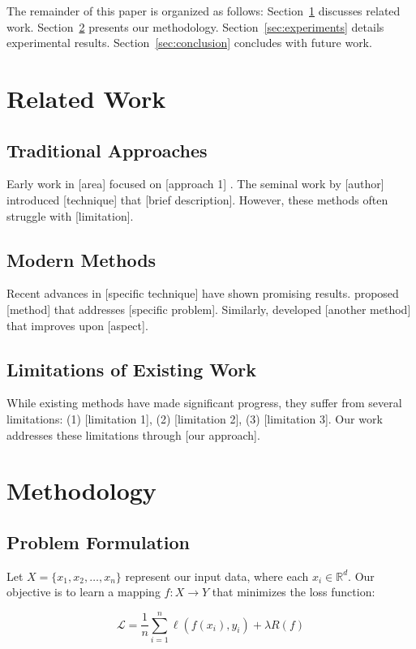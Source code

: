 \documentclass[10pt,twocolumn]{article}
\begin{document}
The remainder of this paper is organized as follows: Section~\ref{sec:related} discusses related work. Section~\ref{sec:method} presents our methodology. Section~\ref{sec:experiments} details experimental results. Section~\ref{sec:conclusion} concludes with future work.

\section{Related Work}
\label{sec:related}

\subsection{Traditional Approaches}
Early work in [area] focused on [approach 1] \cite{reference1}. The seminal work by [author] introduced [technique] that [brief description]. However, these methods often struggle with [limitation].

\subsection{Modern Methods}
Recent advances in [specific technique] have shown promising results. \cite{reference2} proposed [method] that addresses [specific problem]. Similarly, \cite{reference3} developed [another method] that improves upon [aspect].

\subsection{Limitations of Existing Work}
While existing methods have made significant progress, they suffer from several limitations: (1) [limitation 1], (2) [limitation 2], (3) [limitation 3]. Our work addresses these limitations through [our approach].

\section{Methodology}
\label{sec:method}

\subsection{Problem Formulation}
Let $X = \{x_1, x_2, \dots, x_n\}$ represent our input data, where each $x_i \in \mathbb{R}^d$. Our objective is to learn a mapping $f: X \rightarrow Y$ that minimizes the loss function:

\begin{equation}
\mathcal{L} = \frac{1}{n}\sum_{i=1}^{n} \ell(f(x_i), y_i) + \lambda R(f)
\label{eq:loss}
\end{equation}
\end{document}
